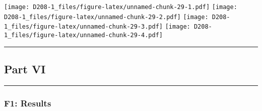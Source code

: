 \documentclass[
]{article}
\newenvironment{Shaded}{\begin{snugshade}}{\end{snugshade}}
\newcommand{\FunctionTok}[1]{\textcolor[rgb]{0.00,0.00,0.00}{#1}}
\newcommand{\NormalTok}[1]{#1}
\newcommand{\SpecialCharTok}[1]{\textcolor[rgb]{0.00,0.00,0.00}{#1}}
\begin{document}
\begin{Shaded}
\end{Shaded}

\texttt{[image: D208-1\_files/figure-latex/unnamed-chunk-29-1.pdf]}
\texttt{[image: D208-1\_files/figure-latex/unnamed-chunk-29-2.pdf]}
\texttt{[image: D208-1\_files/figure-latex/unnamed-chunk-29-3.pdf]}
\texttt{[image: D208-1\_files/figure-latex/unnamed-chunk-29-4.pdf]}

\begin{center}\rule{0.5\linewidth}{0.5pt}\end{center}

\hypertarget{part-vi}{%
\subsection{Part VI}\label{part-vi}}

\begin{center}\rule{0.5\linewidth}{0.5pt}\end{center}

\hypertarget{f1-results}{%
\subsubsection{F1: Results}\label{f1-results}}
\end{document}
